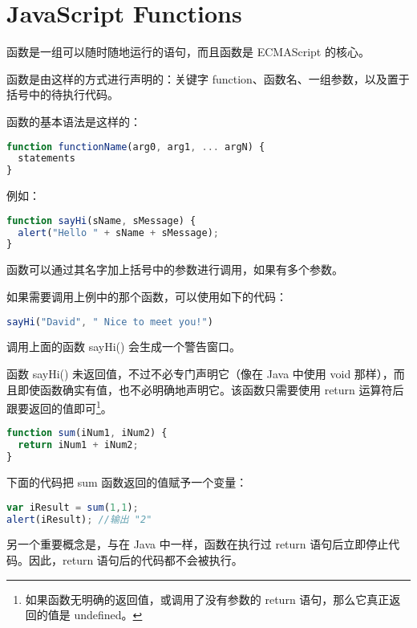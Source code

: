 \part{JavaScript Functions}

函数是一组可以随时随地运行的语句，而且函数是 ECMAScript 的核心。

函数是由这样的方式进行声明的：关键字 function、函数名、一组参数，以及置于括号中的待执行代码。

函数的基本语法是这样的：

\begin{lstlisting}[language=JavaScript]
function functionName(arg0, arg1, ... argN) {
  statements
}
\end{lstlisting}


例如：


\begin{lstlisting}[language=JavaScript]
function sayHi(sName, sMessage) {
  alert("Hello " + sName + sMessage);
}
\end{lstlisting}





函数可以通过其名字加上括号中的参数进行调用，如果有多个参数。

如果需要调用上例中的那个函数，可以使用如下的代码：

\begin{lstlisting}[language=JavaScript]
sayHi("David", " Nice to meet you!")
\end{lstlisting}


调用上面的函数 sayHi() 会生成一个警告窗口。

函数 sayHi() 未返回值，不过不必专门声明它（像在 Java 中使用 void 那样），而且即使函数确实有值，也不必明确地声明它。该函数只需要使用 return 运算符后跟要返回的值即可\footnote{如果函数无明确的返回值，或调用了没有参数的 return 语句，那么它真正返回的值是 undefined。}。


\begin{lstlisting}[language=JavaScript]
function sum(iNum1, iNum2) {
  return iNum1 + iNum2;
}
\end{lstlisting}

下面的代码把 sum 函数返回的值赋予一个变量：


\begin{lstlisting}[language=JavaScript]
var iResult = sum(1,1);
alert(iResult);	//输出 "2"
\end{lstlisting}

另一个重要概念是，与在 Java 中一样，函数在执行过 return 语句后立即停止代码。因此，return 语句后的代码都不会被执行。


